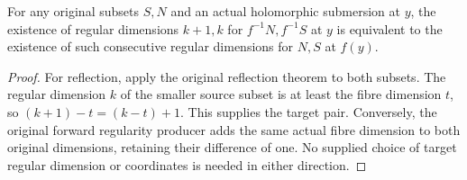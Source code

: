 \begin{corollary}
\label{hir:smooth-submersion-original-codimension-one-pairs}
\leanok
{}
For any original subsets $S,N$ and an actual holomorphic submersion at $y$,
the existence of regular dimensions $k+1,k$ for $f^{-1}N,f^{-1}S$ at $y$
is equivalent to the existence of such consecutive regular dimensions for
$N,S$ at $f(y)$.
\end{corollary}
\begin{proof}
For reflection, apply the original reflection theorem to both subsets.
The regular dimension $k$ of the smaller source subset is at least the
fibre dimension $t$, so $(k+1)-t=(k-t)+1$.  This supplies the target pair.
Conversely, the original forward regularity producer adds the same actual
fibre dimension to both original dimensions, retaining their difference
of one.  No supplied choice of target regular dimension or coordinates
is needed in either direction.
\end{proof}
